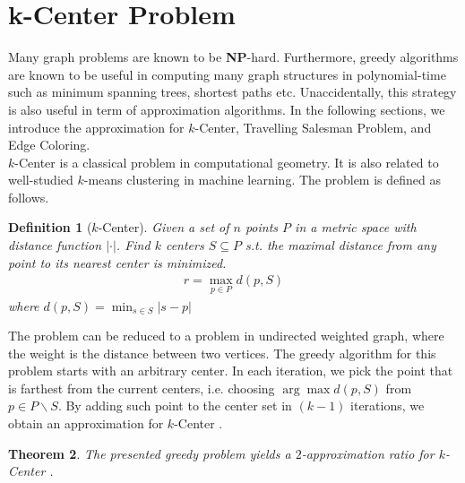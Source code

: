 \documentclass[11pt,psfig,times]{article}
\newcommand*{\NP}{\textbf{NP}}
\newtheorem{theorem}{Theorem}
\newtheorem{definition}[theorem]{Definition}
\begin{document}
\section{k-Center Problem}
Many graph problems are known to be \NP-hard. Furthermore, greedy algorithms are known to be useful in computing 
many graph structures in polynomial-time such as minimum spanning trees, shortest paths etc. Unaccidentally, 
this strategy is also useful in term of approximation algorithms. 
In the following sections, we introduce the approximation for $k$-Center, Travelling Salesman Problem, and Edge Coloring. \\
$k$-Center is a classical problem in computational geometry. It is also related to well-studied $k$-means clustering in machine learning. 
The problem is defined as follows.
\begin{definition}[$k$-Center]
    Given a set of $n$ points $P$ in a metric space with distance function $|\cdot|$. 
    Find $k$ centers $S \subseteq P$ s.t. the maximal distance from any point to its nearest center is minimized.
    \begin{align*}
        r = \max_{p \in P} d(p, S)
    \end{align*}
    where $d(p, S) = \min_{s \in S} |s - p| $
\end{definition}
The problem can be reduced to a problem in undirected weighted graph, where the weight is the distance between two vertices. 
The greedy algorithm for this problem starts with an arbitrary center. In each iteration, we pick the point that 
is farthest from the current centers, i.e. choosing $\arg \max d(p, S)$ from $p \in P \backslash S$. 
By adding such point to the center set in $(k-1)$ iterations, we obtain an approximation for $k$-Center .
\begin{theorem}
    The presented greedy problem yields a $2$-approximation ratio for $k$-Center .
\end{theorem}
\end{document}
